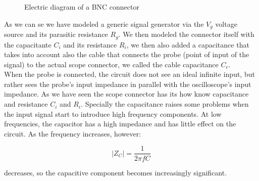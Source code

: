 \documentclass[../main.tex]{subfiles}
\begin{document}
\begin{figure}[h!]
\begin{center}

	
\end{center}	
\caption{Electric diagram of a BNC connector}
\label{bnconnector}
\end{figure}

As we can se we have modeled a generic signal generator via the $V_g$ voltage source and its parasitic resistance $R_g$. We then modeled the connector itself with the capacitante $C_i$ and its resistance $R_i$, we then also added a capacitance that takes into account also the cable that connects the probe (point of input of the signal) to the actual scope connector, we called the cable capacitance $C_c$.\\


When the probe is connected, the circuit does not see an ideal infinite input, but rather sees the probe's input impedance in parallel with the oscilloscope's input impedance.
As we have seen the scope connector has its how know capacitance and resistance $C_i$ and $R_i$. Specially the capacitance raises some problems when the input signal start to introduce high frequency components. At low frequencies, the capacitor has a high impedance and has little effect on the circuit. As the frequency increases, however:

\begin{equation}
|Z_C|=\frac{1}{2\pi f C}
\end{equation}

decreases, so the capacitive component becomes increasingly significant.
\end{document}
